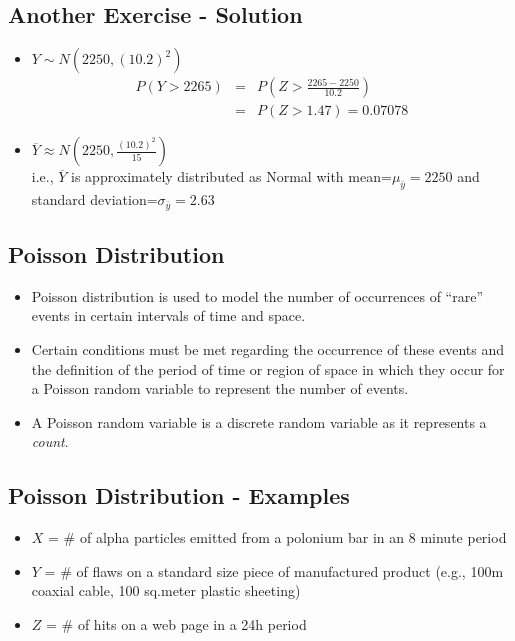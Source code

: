 \documentclass[
  letterpaper,
  DIV=11,
  numbers=noendperiod]{scrartcl}
\begin{document}
\subsection{Another Exercise -
Solution}\label{another-exercise---solution}

\begin{itemize}
\item
  \(Y \sim N(2250, (10.2)^2)\)\\
  \[\begin{eqnarray*}
              P(Y > 2265) & = & P\left(Z > \frac{2265-2250}{10.2}\right)\\[.2in]
              & = & P(Z > 1.47) =  0.07078
  \end{eqnarray*}\]
\item
  \(\overline{Y} \approx N\left(2250, \frac{(10.2)^2}{15}\right)\)\\
  i.e., \(\overline{Y}\) is approximately distributed as Normal with
  mean=\(\mu_{\bar{y}}=2250\) and standard
  deviation=\(\sigma_{\bar{y}} = 2.63\)
\end{itemize}

\subsection{Poisson Distribution}\label{poisson-distribution}

\begin{itemize}
\item
  Poisson distribution is used to model the number of occurrences of
  ``rare'' events in certain intervals of time and space.
\item
  Certain conditions must be met regarding the occurrence of these
  events and the definition of the period of time or region of space in
  which they occur for a Poisson random variable to represent the number
  of events.
\item
  A Poisson random variable is a {discrete} random variable as it
  represents a \emph{count}.
\end{itemize}

\subsection{Poisson Distribution -
Examples}\label{poisson-distribution---examples}

\begin{itemize}
\item
  \(X\) = \# of alpha particles emitted from a polonium bar in an 8
  minute period\\
\item
  \(Y\) = \# of flaws on a standard size piece of manufactured product
  (e.g., 100m coaxial cable, 100 sq.meter plastic sheeting)\\
\item
  \(Z\) = \# of hits on a web page in a 24h period
\end{itemize}
\end{document}
